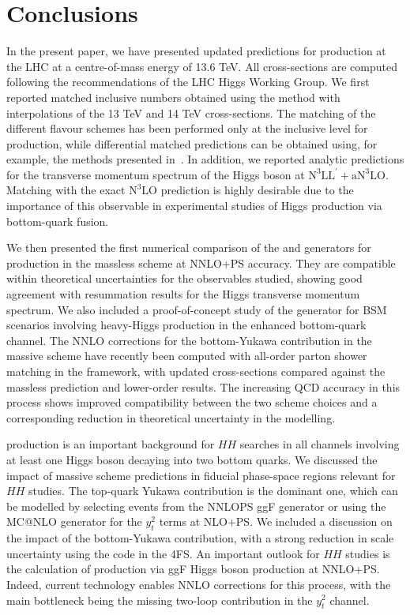 \documentclass[11pt,a4paper]{article}
\begin{document}
\section{Conclusions}\label{sec:conclusions}
In the present paper, we have presented updated predictions for \bbH{} production at the LHC at a centre-of-mass energy of 13.6 TeV. All cross-sections are computed following the recommendations of the LHC Higgs Working Group. We first reported matched inclusive numbers obtained using the \nlonnllpart{} method with interpolations of the 13 TeV and 14 TeV cross-sections. The matching of the different flavour schemes has been performed only at the inclusive level for \bbH{} production, while differential matched predictions can be obtained using, for example, the methods presented in~. In addition, we reported analytic predictions for the transverse momentum spectrum of the Higgs boson at $\text{N}^3\text{LL}^{\prime}+\text{aN}^3\text{LO}$. Matching with the exact $\text{N}^3\text{LO}$ prediction is highly desirable due to the importance of this observable in experimental studies of Higgs production via bottom-quark fusion.

We then presented the first numerical comparison of the \minnlo{} and \GENEVA{} generators for \bbtoH{} production in the massless scheme at NNLO+PS accuracy. They are compatible within theoretical uncertainties for the observables studied, showing good agreement with resummation results for the Higgs transverse momentum spectrum. We also included a proof-of-concept study of the \minnlo{} generator for BSM scenarios involving heavy-Higgs production in the enhanced bottom-quark channel. The NNLO corrections for the bottom-Yukawa contribution in the massive scheme have recently been computed with all-order parton shower matching in the \minnlo{} framework, with updated cross-sections compared against the massless prediction and lower-order results. The increasing QCD accuracy in this process shows improved compatibility between the two scheme choices and a corresponding reduction in theoretical uncertainty in the \bbH{} modelling.

\bbH{} production is an important background for $HH$ searches in all channels involving at least one Higgs boson decaying into two bottom quarks. We discussed the impact of massive scheme predictions in fiducial phase-space regions relevant for $HH$ studies. The top-quark Yukawa contribution is the dominant one, which can be modelled by selecting events from the \textsc{NNLOPS} ggF generator or using the MC@NLO generator for the $y_t^2$ terms at NLO+PS. We included a discussion on the impact of the bottom-Yukawa contribution, with a strong reduction in scale uncertainty using the \minnlo{} code in the 4FS. An important outlook for $HH$ studies is the calculation of \bbH{} production via ggF Higgs boson production at NNLO+PS. Indeed, current \minnlo{} technology enables NNLO corrections for this process, with the main bottleneck being the missing two-loop contribution in the $y_t^2$ channel.
\end{document}
